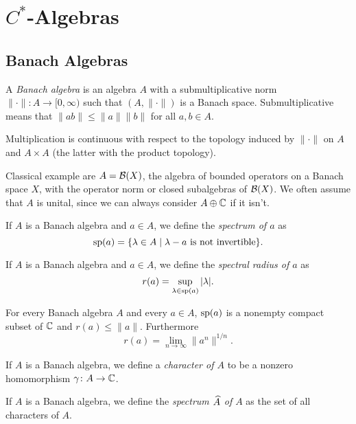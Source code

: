 \section{$C^\ast$-Algebras}
\subsection{Banach Algebras}
\begin{definition}
 A \emph{Banach algebra} is an algebra $A$ with a submultiplicative norm $\|\cdot\|\colon A\to [0,\infty)$ such that $(A,\|\cdot\|)$ is a Banach space. Submultiplicative means that $\|ab\|\leq\|a\|\|b\|$ for all $a,b\in A$.
\end{definition}

\begin{exercise}
 Multiplication is continuous with respect to the topology induced by $\|\cdot\|$ on $A$ and $A\times A$ (the latter with the product topology).
\end{exercise}

\noindent Classical example are $A=\B(X)$, the algebra of bounded operators on a Banach space $X$, with the operator norm or closed subalgebras of $\B(X)$. We often assume that $A$ is unital, since we can always consider $A\oplus\C$ if it isn't.

\begin{definition}
 If $A$ is a Banach algebra and $a\in A$, we define the \emph{spectrum of $a$} as $$\sp(a)=\{\lambda\in A\mid \lambda-a\text{ is not invertible}\}.$$ 
\end{definition}
\begin{definition}
 If $A$ is a Banach algebra and $a\in A$, we define the \emph{spectral radius of $a$} as $$r(a)=\sup_{\lambda\in\sp(a)}|\lambda|.$$
\end{definition}

\begin{theorem}
 For every Banach algebra $A$ and every $a\in A$, $\sp(a)$ is a nonempty compact subset of $\C$ and $r(a)\leq\|a\|$. Furthermore $$r(a)=\lim_{n\to\infty}\|a^n\|^{1/n}.$$
\end{theorem}

\begin{definition}
 If $A$ is a Banach algebra, we define a \emph{character of $A$} to be a nonzero homomorphism $\gamma\colon A\to\C$.
\end{definition}
\begin{definition}
 If $A$ is a Banach algebra, we define the \emph{spectrum $\wh{A}$ of $A$} as the set of all characters of $A$.
\end{definition}

